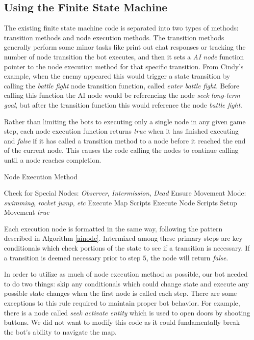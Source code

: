 \subsection{Using the Finite State Machine}

The existing finite state machine code is separated into two types of methods: transition methods and node execution methods. The transition methods generally perform some minor tasks like print out chat responses or tracking the number of node transition the bot executes, and then it sets a \emph{AI node} function pointer to the node execution method for that specific transition. From Cindy's example, when the enemy appeared this would trigger a state transition by calling the \emph{battle fight} node transition function, called \emph{enter battle fight}. Before calling this function the AI node would be referencing the node \emph{seek long-term goal}, but after the transition function this would reference the node \emph{battle fight}.

Rather than limiting the bots to executing only a single node in any given game step, each node execution function returns \emph{true} when it has finished executing and \emph{false} if it has called a transition method to a node before it reached the end of the current node. This causes the code calling the nodes to continue calling until a node reaches completion.

\begin{algorithm}
\caption{Node Execution Method}
\label{ainode}
    {\fontsize{12}{10}\selectfont
    \begin{algorithmic}[1]
        \STATE Check for Special Nodes: \emph{Observer}, \emph{Intermission}, \emph{Dead}
        \STATE Ensure Movement Mode: \emph{swimming}, \emph{rocket jump}, \emph{etc}
        \STATE Execute Map Scripts
        \STATE Execute Node Scripts
        \STATE Setup Movement
        \RETURN \emph{true}
    \end{algorithmic}
    }
\end{algorithm}

Each execution node is formatted in the same way, following the pattern described in Algorithm \ref{ainode}. Intermixed among these primary steps are key conditionals which check portions of the state to see if a transition is necessary. If a transition is deemed necessary prior to step $5$, the node will return \emph{false}.

In order to utilize as much of node execution method as possible, our bot needed to do two things: skip any conditionals which could change state and execute any possible state changes when the first node is called each step. There are some exceptions to this rule required to maintain proper bot behavior. For example, there is a node called \emph{seek activate entity} which is used to open doors by shooting buttons. We did not want to modify this code as it could fundamentally break the bot's ability to navigate the map.

